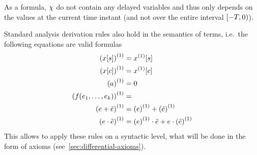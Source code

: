 
    
    As a \FOLR formula, $\chi$ do not contain any delayed variables and thus only depends on the values at the current time instant (and not over the entire interval $[-T,0)$).

    \begin{lemma}[Derivations]\label{lm:derivations}
        Standard analysis derivation rules also hold in the semantics of \ddL terms, i.e.\ the following equations are valid \ddL formulas
        \begin{align}
            \D{(\x[s])} &= \Dx[s]\\
            \D{(\x[c])} &= \Dx[c]\\
            \D{(a)} &= 0\\
            \D{(f(\range{\istrm{1}}{\istrm{k}}))} &=\\
            \D{(\astrm+\bstrm)} &= \D{(\astrm)}+\D{(\bstrm)}\\
            \D{(\astrm\cdot\bstrm)} &= \D{(\astrm)}\cdot\bstrm + \astrm\cdot\D{(\bstrm)}\\
        \end{align}
        This allows to apply these rules on a syntactic level, what will be done in the form of axioms (see~\ref{sec:differential-axioms}).
    \end{lemma}
